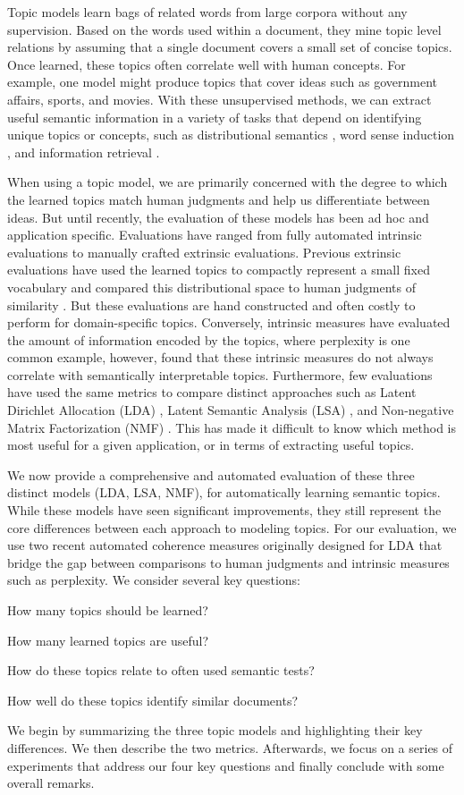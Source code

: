 \label{sec:introduction}
Topic models learn bags of related words from large corpora without any
supervision. Based on the words used within a document, they mine topic level
relations by assuming that a single document covers a small set of concise
topics.  Once learned, these topics often correlate well with human concepts.
For example, one model might produce topics that cover ideas such as government
affairs, sports, and movies.  With these unsupervised methods, we can extract 
useful semantic information in a variety of tasks that depend on identifying
unique topics or concepts, such as distributional semantics
\cite{jurgens10sspace}, word sense induction
\cite{vandeCruys11latentWsi,brody09ldawsi}, and information retrieval
\cite{andrzejewski11ldaIR}.  

When using a topic model, we are primarily concerned with the degree to which
the learned topics match human judgments and help us differentiate between
ideas.  But until recently, the evaluation of these models has been ad hoc and
application specific.  Evaluations have ranged from fully automated intrinsic
evaluations to manually crafted extrinsic evaluations.  Previous extrinsic
evaluations have used the learned topics to compactly represent a small fixed
vocabulary and compared this distributional space to human judgments of
similarity \cite{jurgens10sspace}.  But these evaluations are hand constructed
and often costly to perform for domain-specific topics.  Conversely, intrinsic
measures have evaluated the amount of information encoded by the topics, where 
perplexity is one common example\cite{wallach2009evaluation}, however, 
found that these intrinsic measures do not always correlate with semantically
interpretable topics.  Furthermore, few evaluations have used the same metrics
to compare distinct approaches such as Latent Dirichlet Allocation (LDA)
\cite{blei03lda},  Latent Semantic Analysis (LSA) \cite{landauer97solution}, and
Non-negative Matrix Factorization (NMF) \cite{Lee00algorithmsfor}.  This has
made it difficult to know which method is most useful for a given application,
or in terms of extracting useful topics.

We now provide a comprehensive and automated evaluation of these three distinct
models (LDA, LSA, NMF), for automatically learning semantic topics.  While these
models have seen significant improvements, they still represent the core
differences between each approach to modeling topics.  For our evaluation, we
use two recent automated coherence measures \cite{mimno11umass,newman10uci}
originally designed for LDA that bridge the gap between comparisons to
human judgments and intrinsic measures such as perplexity.  We consider several
key questions:
\begin{enumerate*}
{\footnotesize
 \item How many topics should be learned?
 \item How many learned topics are useful?
 \item How do these topics relate to often used semantic tests?
 \item How well do these topics identify similar documents?
 }
\end{enumerate*}

We begin by summarizing the three topic models and highlighting their key
differences.  We then describe the two metrics.  Afterwards, we focus on a
series of experiments that address our four key questions and finally conclude
with some overall remarks.
